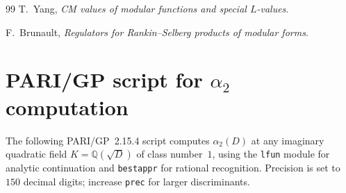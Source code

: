 \documentclass[12pt]{amsart}
\theoremstyle{definition}
\newcommand{\Q}{\mathbb{Q}}
\begin{document}
\begin{thebibliography}{99}
  T.~Yang,
  \textit{CM values of modular functions and special $L$-values}.

  F.~Brunault,
  \textit{Regulators for Rankin--Selberg products of modular forms}.

\end{thebibliography}

\appendix

\section{PARI/GP script for $\alpha_2$ computation}
\label{sec:pari}

The following PARI/GP~2.15.4 script computes $\alpha_2(D)$ at any imaginary
quadratic field $K = \Q(\sqrt{D})$ of class number~$1$, using the
\texttt{lfun} module for analytic continuation and \texttt{bestappr} for
rational recognition.
Precision is set to $150$ decimal digits; increase \texttt{prec} for larger
discriminants.
\end{document}
